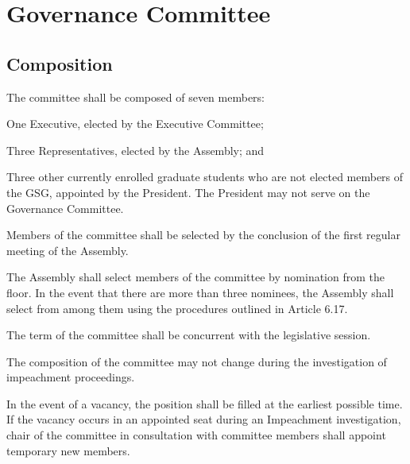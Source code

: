 \chapter{Governance Committee}

\section{Composition}
\begin{bylaws-number}
  \item The committee shall be composed of seven members:
  \begin{bylaws-number}
    \item One Executive, elected by the Executive Committee;
    \item Three Representatives, elected by the Assembly; and
    \item Three other currently enrolled graduate students who are not elected members of the GSG, appointed by the President.
The President may not serve on the Governance Committee.
  \end{bylaws-number}
  \item Members of the committee shall be selected by the conclusion of the first regular meeting of the Assembly.
  \item The Assembly shall select members of the committee by nomination from the floor. In the event that there are more than three nominees, the Assembly shall select from among them using the procedures outlined in Article 6.17.
  \item The term of the committee shall be concurrent with the legislative session.
  \item The composition of the committee may not change during the investigation of impeachment proceedings.
  \item In the event of a vacancy, the position shall be filled at the earliest possible time. If the vacancy occurs in an appointed seat during an Impeachment investigation, chair of the committee in consultation with committee members shall appoint temporary new members.
\end{bylaws-number}

